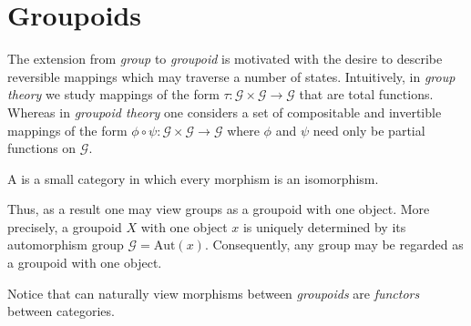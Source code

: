 %
%

\section{Groupoids}
\label{sec:groupoids}

The extension from \emph{group} to \emph{groupoid} is motivated with the
desire to describe reversible mappings which may traverse a number of states.
Intuitively, in \emph{group theory} we study mappings of the form
$\tau : \mathcal{G} \times \mathcal{G} \to \mathcal{G}$
that are total functions. Whereas in \emph{groupoid theory} one considers a set
of compositable and invertible mappings of the form
$\phi \circ \psi : \mathcal{G} \times \mathcal{G} \to \mathcal{G}$
where $\phi$ and $\psi$ need only be partial functions on $\mathcal{G}$.

\begin{defn}[Groupoid]
 \label{defn:groupoid}

 A  is a small category in which every morphism is an isomorphism.

\end{defn}

Thus, as a result one may view groups as a groupoid with one object.
More precisely, a groupoid $X$ with one object $x$ is uniquely determined
by its automorphism group $\mathcal{G}=\text{Aut}(x)$. Consequently, any group
may be regarded as a groupoid with one object.

Notice that can naturally view morphisms between \emph{groupoids} are
\emph{functors} between categories.

